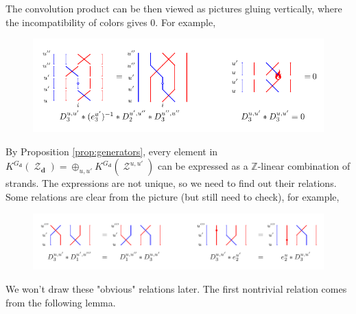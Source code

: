 \documentclass[reqno,11pt]{book}
\numberwithin{equation}{section}
\theoremstyle{plain}
\theoremstyle{plain}
\numberwithin{equation}{section}
\theoremstyle{remark}
\DeclareMathOperator{\St}{\mathcal{Z}}
\newcommand{\dimvec}[1]{\mathbf{#1}}
\begin{document}
The convolution product can be then viewed as pictures gluing vertically, where the incompatibility of colors gives $0$. For example,

\begin{figure}[ht]
  \vspace{0cm}
    \centering  \includegraphics[width=12cm]{figures/strands/glue_vertically.pdf}
      \label{fig:glue_vertically}        
\end{figure}

By Proposition \ref{prop:generators}, every element in $K^{G_{\dimvec{d}}}(\St_{\dimvec{d}})= \oplus_{u,u'} K^{G_{\dimvec{d}}}(\St^{u,u'})$  can be expressed as a $\mathbb{Z}$-linear combination of strands. The expressions are not unique, so we need to find out their relations. Some relations are clear from the picture (but still need to check), for example,

\begin{figure}[ht]
  \vspace{0cm}
    \centering  \includegraphics[width=15cm]{figures/strands/clear_relations.pdf}
      \label{fig:clear_relations}        
\end{figure}

We won't draw these "obvious" relations later. The first nontrivial relation comes from the following lemma.
\end{document}
